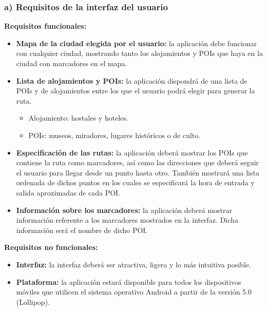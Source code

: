 \subsubsection[Requisitos interfaz]{a) Requisitos de la interfaz del usuario}
\textbf{Requisitos funcionales:}
\begin{itemize}
	\item \textbf{Mapa de la ciudad elegida por el usuario:} la aplicación debe funcionar con cualquier ciudad, mostrando tanto los alojamientos y POIs que haya en la ciudad con marcadores en el mapa.
	\item\textbf{Lista de alojamientos y POIs:} la aplicación dispondrá de una lista de POIs y de alojamientos entre los que el usuario podrá elegir para generar la ruta. 
	\begin{itemize}
		\item Alojamiento: hostales y hoteles.
		\item POIs: museos, miradores, lugares históricos o de culto.
	\end{itemize}
	\item\textbf{ Especificación de las rutas:} la aplicación deberá mostrar los POIs que contiene la ruta como marcadores, así como las direcciones que deberá seguir el usuario para llegar desde un punto hasta otro. También mostrará una lista ordenada de dichos puntos en los cuales se especificará la hora de entrada y salida aproximadas de cada POI.
	\item \textbf{Información sobre los marcadores:} la aplicación deberá mostrar información referente a los marcadores mostrados en la interfaz. Dicha información será el nombre de dicho POI.
\end{itemize}
\textbf{Requisitos no funcionales:}
\begin{itemize}
	\item \textbf{Interfaz:} la interfaz deberá ser atractiva, ligera y lo más intuitiva posible.
	\item \textbf{Plataforma:} la aplicación estará disponible para todos los dispositivos móviles que utilicen el sistema operativo Android a partir de la versión 5.0 (Lollipop).
\end{itemize}

